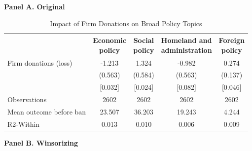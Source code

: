 \documentclass[12pt,a4paper]{article}
\begin{document}
\begin{table}[!htbp]\centering
\caption{Impact of Firm Donations on Broad Policy Topics}
\label{tab:policyareas}

\bigskip
\textbf{Panel A. Original}\\[1mm]

{
\def\sym#1{\ifmmode^{#1}\else\(^{#1}\)\fi}
\begin{tabular}{lcccc}
\hline\hline
                & \shortstack{Economic\\policy}
                & \shortstack{Social\\policy}
                & \shortstack{Homeland and\\administration}
                & \shortstack{Foreign\\policy} \\
\hline
Firm donations (loss)
                &   -1.213        &    1.324        &   -0.982        &    0.274        \\
                &   (0.563)       &   (0.584)       &   (0.563)       &   (0.137)       \\
                &   [0.032]       &   [0.024]       &   [0.082]       &   [0.046]       \\
Observations    &    2602         &    2602         &    2602         &    2602         \\
Mean outcome before ban
                &   23.507        &   36.203        &   19.243        &    4.244        \\
R2-Within       &    0.013        &    0.010        &    0.006        &    0.009        \\
\hline\hline
\end{tabular}
}

\bigskip
\textbf{Panel B. Winsorizing}\\[1mm]


\end{table}
\end{document}
